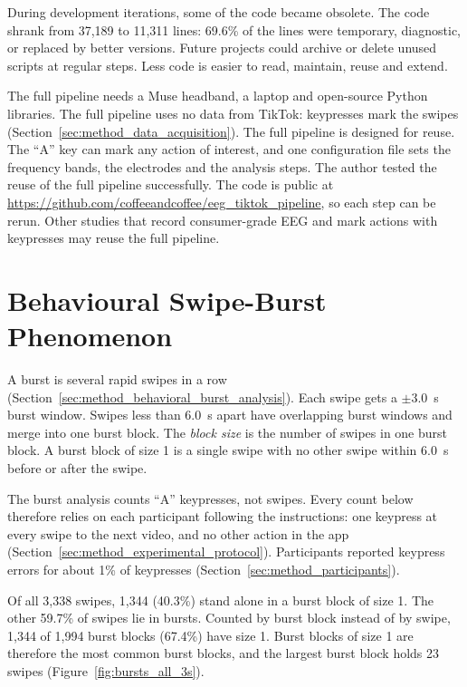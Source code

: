\documentclass[12pt,a4paper]{report}
\begin{document}
During development iterations, some of the code became obsolete. The code shrank from 37,189 to 11,311 lines: 69.6\% of the lines were temporary, diagnostic, or replaced by better versions. Future projects could archive or delete unused scripts at regular steps. Less code is easier to read, maintain, reuse and extend.

The full pipeline needs a Muse headband, a laptop and open-source Python libraries. The full pipeline uses no data from TikTok: keypresses mark the swipes (Section~\ref{sec:method_data_acquisition}). The full pipeline is designed for reuse. The ``A'' key can mark any action of interest, and one configuration file sets the frequency bands, the electrodes and the analysis steps. The author tested the reuse of the full pipeline successfully. The code is public at \url{https://github.com/coffeeandcoffee/eeg_tiktok_pipeline}, so each step can be rerun. Other studies that record consumer-grade EEG and mark actions with keypresses may reuse the full pipeline.

\section{Behavioural Swipe-Burst Phenomenon} \label{sec:results_burst_analysis}

A burst is several rapid swipes in a row (Section~\ref{sec:method_behavioral_burst_analysis}). Each swipe gets a $\pm$3.0~s burst window. Swipes less than 6.0~s apart have overlapping burst windows and merge into one burst block. The \emph{block size} is the number of swipes in one burst block. A burst block of size 1 is a single swipe with no other swipe within 6.0~s before or after the swipe.

The burst analysis counts ``A'' keypresses, not swipes. Every count below therefore relies on each participant following the instructions: one keypress at every swipe to the next video, and no other action in the app (Section~\ref{sec:method_experimental_protocol}). Participants reported keypress errors for about 1\% of keypresses (Section~\ref{sec:method_participants}).

Of all 3{,}338 swipes, 1{,}344 (40.3\%) stand alone in a burst block of size 1. The other 59.7\% of swipes lie in bursts. Counted by burst block instead of by swipe, 1{,}344 of 1{,}994 burst blocks (67.4\%) have size 1. Burst blocks of size 1 are therefore the most common burst blocks, and the largest burst block holds 23 swipes (Figure~\ref{fig:bursts_all_3s}).
\end{document}
